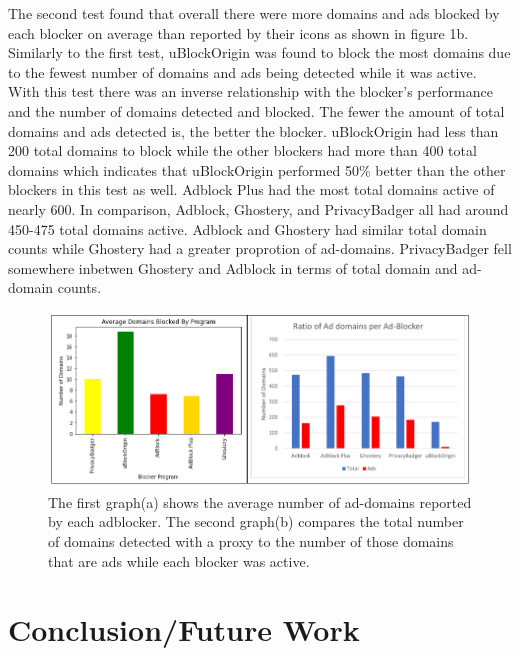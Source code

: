 \documentclass[sigsmall]{acmart}
\begin{document}
The second test found that overall there were more domains and ads blocked by each blocker on average than reported by their icons as shown in figure 1b. Similarly to the first test, uBlockOrigin was found to block the most domains due to the fewest number of domains and ads being detected while it was active. With this test there was an inverse relationship with the blocker's performance and the number of domains detected and blocked. The fewer the amount of total domains and ads detected is, the better the blocker. uBlockOrigin had less than 200 total domains to block while the other blockers had more than 400 total domains which indicates that uBlockOrigin performed 50\% better than the other blockers in this test as well. Adblock Plus had the most total domains active of nearly 600. In comparison, Adblock, Ghostery, and PrivacyBadger all had around 450-475 total domains active. Adblock and Ghostery had similar total domain counts while Ghostery had a greater proprotion of ad-domains. PrivacyBadger fell somewhere inbetwen Ghostery and Adblock in terms of total domain and ad-domain counts.   
\begin{figure}[h]
  \includegraphics[scale = 0.75]{Edit3.png}
  \caption{ The first graph(a) shows the average number of ad-domains reported by each adblocker. The second graph(b) compares the total number of domains detected with a proxy to the number of those domains that are ads while each blocker was active.}
  \label{fig:graph1ab}
\end{figure}

\section*{Conclusion/Future Work}




\end{document}
